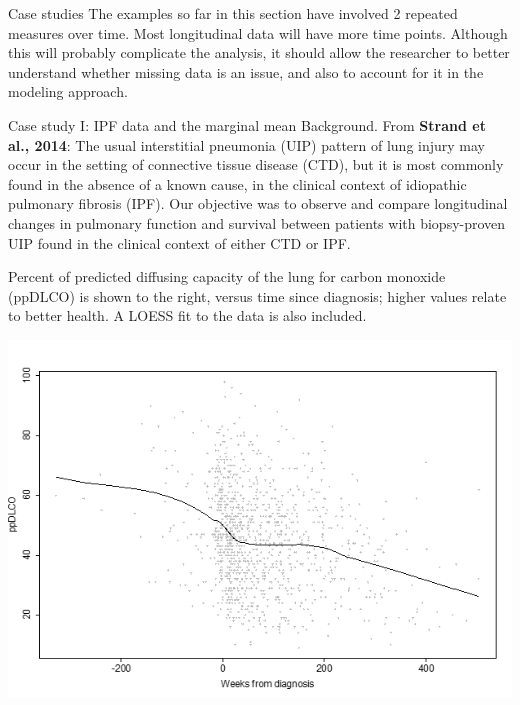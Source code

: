 \documentclass[
  9pt,
  ignorenonframetext,
]{beamer}
\begin{document}
\begin{frame}{Case studies}
\protect\hypertarget{case-studies-1}{}
The examples so far in this section have involved 2 repeated measures
over time. Most longitudinal data will have more time points. Although
this will probably complicate the analysis, it should allow the
researcher to better understand whether missing data is an issue, and
also to account for it in the modeling approach.

\begin{block}{Case study I: IPF data and the marginal mean}
\protect\hypertarget{case-study-i-ipf-data-and-the-marginal-mean}{}
Background. From \textbf{Strand et al., 2014}: The usual interstitial
pneumonia (UIP) pattern of lung injury may occur in the setting of
connective tissue disease (CTD), but it is most commonly found in the
absence of a known cause, in the clinical context of idiopathic
pulmonary fibrosis (IPF). Our objective was to observe and compare
longitudinal changes in pulmonary function and survival between patients
with biopsy-proven UIP found in the clinical context of either CTD or
IPF.
\end{block}
\end{frame}

\begin{frame}{}
\protect\hypertarget{section-6}{}
Percent of predicted diffusing capacity of the lung for carbon monoxide
(ppDLCO) is shown to the right, versus time since diagnosis; higher
values relate to better health. A LOESS fit to the data is also
included.

\begin{center}\includegraphics[width=0.7\linewidth]{figs_L20/f6} \end{center}
\end{frame}
\end{document}
